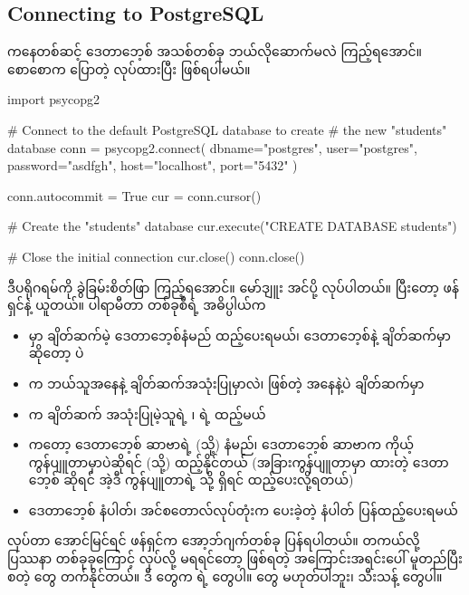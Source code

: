 \subsection*{Connecting to PostgreSQL}
 ကနေတစ်ဆင့် ဒေတာဘေ့စ် အသစ်တစ်ခု ဘယ်လိုဆောက်မလဲ ကြည့်ရအောင်။ စောစောက ပြောတဲ့   လုပ်ထားပြီး ဖြစ်ရပါမယ်။
%
\begin{py}
import psycopg2

# Connect to the default PostgreSQL database to create 
# the new "students" database
conn = psycopg2.connect(
    dbname="postgres",
    user="postgres",
    password="asdfgh",
    host="localhost",
    port="5432"
)

conn.autocommit = True
cur = conn.cursor()

# Create the "students" database
cur.execute("CREATE DATABASE students")

# Close the initial connection
cur.close()
conn.close()
\end{py}
%
ဒီပရိုဂရမ်ကို ခွဲခြမ်းစိတ်ဖြာ ကြည့်ရအောင်။  မော်ဒျူး အင်ပို့ လုပ်ပါတယ်။ ပြီးတော့  ဖန်ရှင်နဲ့  ယူတယ်။ ပါရာမီတာ တစ်ခုစီရဲ့ အဓိပ္ပါယ်က
%
\begin{itemize}
    \item {} မှာ ချိတ်ဆက်မဲ့ ဒေတာဘေ့စ်နံမည် ထည့်ပေးရမယ်၊  ဒေတာဘေ့စ်နဲ့ ချိတ်ဆက်မှာဆိုတော့  ပဲ
    \item {} က ဘယ်သူအနေနဲ့ ချိတ်ဆက်အသုံးပြုမှာလဲ၊  ဖြစ်တဲ့  အနေနဲ့ပဲ ချိတ်ဆက်မှာ 
    \item {} က ချိတ်ဆက် အသုံးပြုမဲ့သူရဲ့  ၊   ရဲ့  ထည့်မယ် 
    \item {} ကတော့ ဒေတာဘေ့စ် ဆာဗာရဲ့  (သို့)  နံမည်၊ ဒေတာဘေ့စ် ဆာဗာက ကိုယ့်ကွန်ပျူတာမှာပဲဆိုရင်  (သို့)  ထည့်နိုင်တယ် (အခြားကွန်ပျူတာမှာ  ထားတဲ့ ဒေတာဘေ့စ် ဆိုရင် အဲ့ဒီ ကွန်ပျူတာရဲ့  သို့  ရှိရင်  ထည့်ပေးလို့ရတယ်) 
    \item {}  ဒေတာဘေ့စ်  နံပါတ်၊ အင်စတောလ်လုပ်တုံးက ပေးခဲ့တဲ့  နံပါတ် ပြန်ထည့်ပေးရမယ်
\end{itemize}
%
 လုပ်တာ အောင်မြင်ရင်  ဖန်ရှင်က  အော့ဘ်ဂျက်တစ်ခု ပြန်ရပါတယ်။ တကယ်လို့ ပြဿနာ တစ်ခုခုကြောင့်  လုပ်လို့ မရရင်တော့ ဖြစ်ရတဲ့ အကြောင်းအရင်းပေါ် မူတည်ပြီး \fEn{,}  စတဲ့  တွေ တက်နိုင်တယ်။ ဒီ  တွေက   ရဲ့  တွေပါ။  တွေ မဟုတ်ပါဘူး၊  သီးသန့်  တွေပါ။


